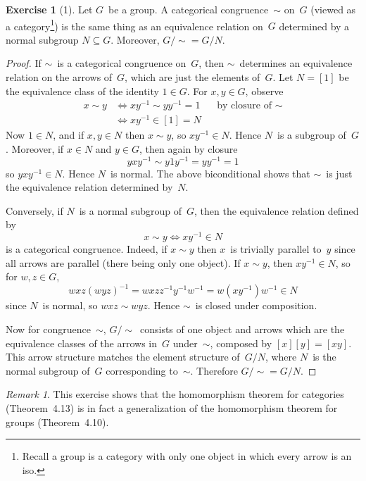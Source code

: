 \documentclass[letterpaper,12pt]{article}
\newcommand{\eq}{\sim}
\newcommand{\2}{\cat{2}}
\theoremstyle{definition}
\newtheorem*{exer}{Exercise}
\theoremstyle{remark}
\newtheorem*{rmk}{Remark}
\theoremstyle{direction}
\begin{document}
\begin{exer}[1]
Let \(G\)~be a group. A categorical congruence~\(\eq\) on~\(G\) (viewed as a category\footnote{Recall a group is a category with only one object in which every arrow is an iso.}) is the same thing as an equivalence relation on~\(G\) determined by a normal subgroup \(N\subseteq G\). Moreover, \(G/{\eq}=G/N\).
\end{exer}
\begin{proof}
If \(\eq\)~is a categorical congruence on~\(G\), then \(\eq\)~determines an equivalence relation on the arrows of~\(G\), which are just the elements of~\(G\). Let \(N=[1]\) be the equivalence class of the identity \(1\in G\). For \(x,y\in G\), observe
\begin{align*}
x\eq y&\iff xy^{-1}\eq yy^{-1}=1&&\text{by closure of~\(\eq\)}\\
	&\iff xy^{-1}\in [1]=N
\end{align*}
Now \(1\in N\), and if \(x,y\in N\) then \(x\eq y\), so \(xy^{-1}\in N\). Hence \(N\)~is a subgroup of~\(G\). Moreover, if \(x\in N\) and \(y\in G\), then again by closure
\[yxy^{-1}\eq y1y^{-1}=yy^{-1}=1\]
so \(yxy^{-1}\in N\). Hence \(N\)~is normal. The above biconditional shows that \(\eq\)~is just the equivalence relation determined by~\(N\).

Conversely, if \(N\)~is a normal subgroup of~\(G\), then the equivalence relation defined by
\[x\eq y\iff xy^{-1}\in N\]
is a categorical congruence. Indeed, if \(x\eq y\) then \(x\)~is trivially parallel to~\(y\) since all arrows are parallel (there being only one object). If \(x\eq y\), then \(xy^{-1}\in N\), so for \(w,z\in G\),
\[wxz(wyz)^{-1}=wxzz^{-1}y^{-1}w^{-1}=w(xy^{-1})w^{-1}\in N\]
since \(N\)~is normal, so \(wxz\eq wyz\). Hence \(\eq\)~is closed under composition.

Now for congruence~\(\eq\), \(G/{\eq}\)~consists of one object and arrows which are the equivalence classes of the arrows in~\(G\) under~\(\eq\), composed by \([x][y]=[xy]\). This arrow structure matches the element structure of~\(G/N\), where \(N\)~is the normal subgroup of~\(G\) corresponding to~\(\eq\). Therefore \(G/{\eq}=G/N\).
\end{proof}
\begin{rmk}
This exercise shows that the homomorphism theorem for categories (Theorem~4.13) is in fact a generalization of the homomorphism theorem for groups (Theorem~4.10).
\end{rmk}
\end{document}
